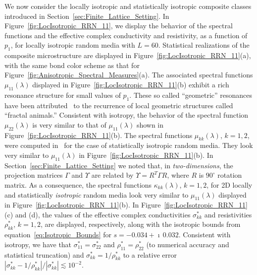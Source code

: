\documentclass{cmslatex}
\begin{document}
We now consider the locally isotropic and statistically isotropic
composite classes introduced in Section~\ref{sec:Finite_Lattice_Setting}.
In Figure~\ref{fig:LocIsotropic_RRN_11}, we display the behavior of the 
spectral functions and the effective complex conductivity and
resistivity, as a function of $p_1$, for locally isotropic random
media with $L=60$. Statistical realizations of the composite microstructure
are displayed in Figure~\ref{fig:LocIsotropic_RRN_11}(a), with the
same bond color scheme as that for
Figure~\ref{fig:Anisotropic_Spectral_Measures}(a). The associated
spectral functions $\mu_{11}(\lambda)$ displayed in
Figure~\ref{fig:LocIsotropic_RRN_11}(b) exhibit a rich  
resonance structure for small values of $p_1$. These so called
``geometric'' resonances have been
attributed~\cite{Jonckheere_Luck_JPA_1998} to the recurrence of  
local geometric structures called ``fractal animals.''  Consistent
with isotropy, the behavior of the spectral function $\mu_{22}(\lambda)$ is
very similar to that of $\mu_{11}(\lambda)$ shown in
Figure~\ref{fig:LocIsotropic_RRN_11}(b). The spectral functions
$\mu_{kk}(\lambda)$, $k=1,2$, were computed in~\cite{Murphy:JMP:063506} for
the case of statistically isotropic random media. They look very
similar to $\mu_{11}(\lambda)$ in Figure~\ref{fig:LocIsotropic_RRN_11}(b).  In
Section~\ref{sec:Finite_Lattice_Setting} we noted that, in 
\emph{two-dimensions}, the projection matrices $\Gamma$ and $\Upsilon$ 
are related by $\Upsilon=R^T\Gamma R$, where $R$ is $90^\circ$ rotation
matrix. As a consequence, the spectral functions $\kappa_{kk}(\lambda)$, $k=1,2$, for
2D locally and statistically \emph{isotropic} random media look very
similar to $\mu_{11}(\lambda)$ displayed in
Figure~\ref{fig:LocIsotropic_RRN_11}(b). In
Figure~\ref{fig:LocIsotropic_RRN_11}(c) and (d), the values of the  
effective complex conductivities $\sigma^*_{kk}$ and resistivities
$\rho^*_{kk}$, $k=1,2$, are displayed, respectively,
along with the isotropic bounds from
equation~\eqref{eq:Isotropic_Bounds} for
$s=-0.034+\imath\,0.032$. Consistent with 
isotropy, we have that $\sigma^*_{11}=\sigma^*_{22}$ and $\rho^*_{11}=\rho^*_{22}$ (to
numerical accuracy and statistical truncation) and
$\sigma^*_{kk}=1/\rho^*_{kk}$ to a relative error
$|\sigma^*_{kk}-1/\rho^*_{kk}|/|\sigma^*_{kk}|\lesssim10^{-2}$.
\end{document}
